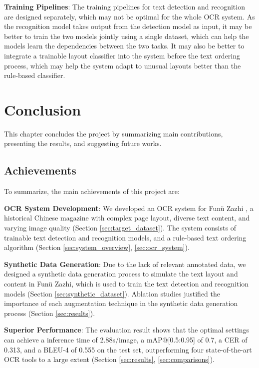 \documentclass[12pt,twoside]{report}
\begin{document}
\textbf{Training Pipelines}: The training pipelines for text detection and recognition are designed separately, which may not be optimal for the whole OCR system. As the recognition model takes output from the detection model as input, it may be better to train the two models jointly using a single dataset, which can help the models learn the dependencies between the two tasks. It may also be better to integrate a trainable layout classifier into the system before the text ordering process, which may help the system adapt to unusual layouts better than the rule-based classifier.

\chapter{Conclusion}
\label{sec:conclusion}
This chapter concludes the project by summarizing main contributions, presenting the results, and suggesting future works.

\section{Achievements}
\label{sec:achievements}
To summarize, the main achievements of this project are:

\textbf{OCR System Development}: We developed an OCR system for Funü Zazhi \cite{fnzz}, a historical Chinese magazine with complex page layout, diverse text content, and varying image quality (Section \ref{sec:target_dataset}). The system consists of trainable text detection and recognition models, and a rule-based text ordering algorithm (Section \ref{sec:system_overview}, \ref{sec:ocr_system}).

\textbf{Synthetic Data Generation}: Due to the lack of relevant annotated data, we designed a synthetic data generation process to simulate the text layout and content in Funü Zazhi, which is used to train the text detection and recognition models (Section \ref{sec:synthetic_dataset}). Ablation studies justified the importance of each augmentation technique in the synthetic data generation process (Section \ref{sec:results}).

\textbf{Superior Performance}: The evaluation result shows that the optimal settings can achieve a inference time of 2.88s/image, a mAP@[0.5:0.95] of 0.7, a CER of 0.313, and a BLEU-4 of 0.555 on the test set, outperforming four state-of-the-art OCR tools to a large extent (Section \ref{sec:results}, \ref{sec:comparisons}).
\end{document}
